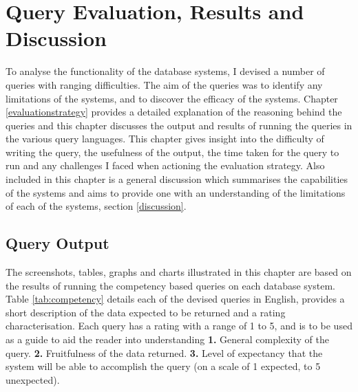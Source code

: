 \chapter{Query Evaluation, Results and Discussion}\label{results}
To analyse the functionality of the database systems, I devised a number of queries with ranging difficulties. The aim of the queries was to identify any limitations of the systems, and to discover the efficacy of the systems. Chapter \ref{evaluationstrategy} provides a detailed explanation of the reasoning behind the queries and this chapter discusses the output and results of running the queries in the various query languages. This chapter gives insight into the difficulty of writing the query, the usefulness of the output, the time taken for the query to run and any challenges I faced when actioning the evaluation strategy. Also included in this chapter is a general discussion which summarises the capabilities of the systems and aims to provide one with an understanding of the limitations of each of the systems, section  \ref{discussion}.

\section{Query Output}\label{output}
The screenshots, tables, graphs and charts illustrated in this chapter are based on the results of running the competency based queries on each database system. Table \ref{tab:competency} details each of the devised queries in English, provides a short description of the data expected to be returned and a rating characterisation. Each query has a rating with a range of 1 to 5, and is to be used as a guide to aid the reader into understanding \textbf{1.} General complexity of the query. \textbf{2.} Fruitfulness of the data returned. \textbf{3.} Level of expectancy that the system will be able to accomplish the query (on a scale of 1 expected, to 5 unexpected).

